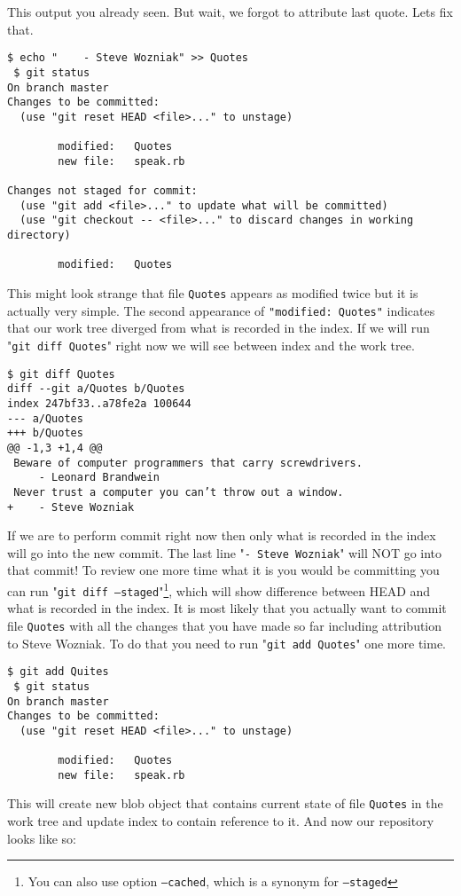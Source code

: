 \documentclass{article}
\theoremstyle{definition}
\begin{document}
        \noindent This output you already seen. But wait, we forgot to attribute last quote. Lets fix that.

    \begin{Verbatim}[frame=single]
 $ echo "    - Steve Wozniak" >> Quotes
 $ git status
On branch master
Changes to be committed:
  (use "git reset HEAD <file>..." to unstage)

        modified:   Quotes
        new file:   speak.rb

Changes not staged for commit:
  (use "git add <file>..." to update what will be committed)
  (use "git checkout -- <file>..." to discard changes in working directory)

        modified:   Quotes
        \end{Verbatim}
        This might look strange that file \texttt{Quotes} appears as modified twice but it is actually very simple. The
        second appearance of \texttt{"modified: Quotes"} indicates that our work tree diverged from what is recorded in
        the index. If we will run "\texttt{git diff Quotes}" right now we will see between index and the work tree.

    \begin{Verbatim}[frame=single]
 $ git diff Quotes
diff --git a/Quotes b/Quotes
index 247bf33..a78fe2a 100644
--- a/Quotes
+++ b/Quotes
@@ -1,3 +1,4 @@
 Beware of computer programmers that carry screwdrivers.
     - Leonard Brandwein
 Never trust a computer you can’t throw out a window.
+    - Steve Wozniak
        \end{Verbatim}
        If we are to perform commit right now then only what is recorded in the index will go into the new commit. The
        last line "\texttt{- Steve Wozniak}" will NOT go into that commit! To review one more time what it is you would
        be committing you can run "\texttt{git diff --staged}"\footnote{You can also use option \texttt{--cached},
          which is a synonym for \texttt{--staged}}, which will show difference between HEAD and what is recorded in
        the index. It is most likely that you actually want to commit file \texttt{Quotes} with all the changes that
        you have made so far including attribution to Steve Wozniak. To do that you need to run
        "\texttt{git add Quotes}" one more time.

    \begin{Verbatim}[frame=single]
 $ git add Quites
 $ git status
On branch master
Changes to be committed:
  (use "git reset HEAD <file>..." to unstage)

        modified:   Quotes
        new file:   speak.rb
        \end{Verbatim}
        This will create new blob object that contains current state of file \texttt{Quotes} in the work tree and
        update index to contain reference to it. And now our repository looks like so:
\end{document}
